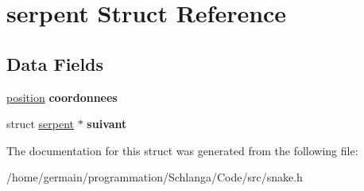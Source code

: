 \hypertarget{structserpent}{\section{serpent Struct Reference}
\label{structserpent}
}
\subsection*{Data Fields}
\begin{DoxyCompactItemize}
\item 
\hypertarget{structserpent_af443f40fa20dcd8df78e12f66301031a}{\hyperlink{structposition}{position} {\bfseries coordonnees}}\label{structserpent_af443f40fa20dcd8df78e12f66301031a}

\item 
\hypertarget{structserpent_a68a830b195ddf9e590926b84ece77827}{struct \hyperlink{structserpent}{serpent} $\ast$ {\bfseries suivant}}\label{structserpent_a68a830b195ddf9e590926b84ece77827}

\end{DoxyCompactItemize}


The documentation for this struct was generated from the following file\-:\begin{DoxyCompactItemize}
\item 
/home/germain/programmation/\-Schlanga/\-Code/src/snake.\-h\end{DoxyCompactItemize}
